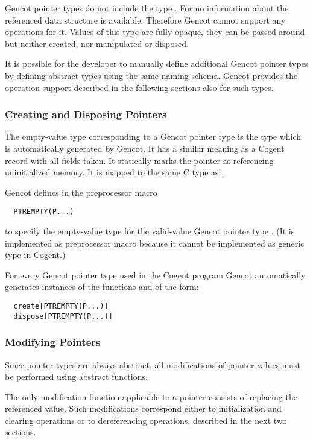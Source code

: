 Gencot pointer types do not include the type . For  no information about the referenced data structure is available. 
Therefore Gencot cannot support any operations 
for it. Values of this type are fully opaque, they can be passed around but neither created, nor manipulated or disposed. 

It is possible for the developer to manually define additional Gencot pointer types by defining abstract types using the same naming schema.
Gencot provides the operation support described in the following sections also for such types.

\subsubsection{Creating and Disposing Pointers}

The empty-value type corresponding to a Gencot pointer type  is the type  which
is automatically generated by Gencot. It has a similar meaning as a Cogent
record with all fields taken. It statically marks the pointer as referencing uninitialized memory. It is mapped to the same C 
type as .

Gencot defines in  the preprocessor macro 
\begin{verbatim}
  PTREMPTY(P...)
\end{verbatim}
to specify the empty-value type for the valid-value Gencot pointer type . (It is implemented 
as preprocessor macro because it cannot be implemented as generic type in Cogent.)

For every Gencot pointer type  used in the Cogent program Gencot automatically
generates instances of the functions  and  of the form:
\begin{verbatim}
  create[PTREMPTY(P...)]
  dispose[PTREMPTY(P...)]
\end{verbatim}

\subsubsection{Modifying Pointers}

Since pointer types are always abstract, all modifications of pointer values must be performed using abstract functions.

The only modification function applicable to a pointer consists of replacing the referenced value. Such modifications correspond
either to initialization and clearing operations or to dereferencing operations, described in the next two sections.

